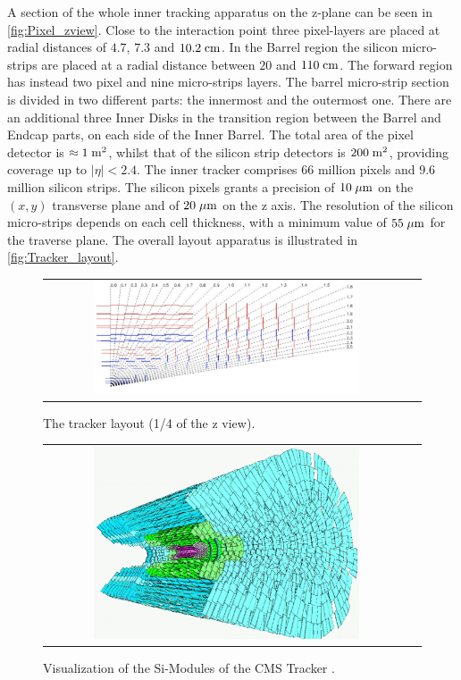A section of the whole inner tracking apparatus on the z-plane can be seen in \autoref{fig:Pixel_zview}. Close to the interaction point three pixel-layers are placed at radial distances of $4.7$, $7.3$ and $10.2\;\text{cm}$. In the Barrel region the silicon micro-strips are placed at a radial distance between $20$ and $110\;\text{cm}$. The forward region has instead two pixel and nine micro-strips layers. The barrel micro-strip section is divided in two different parts: the innermost and the outermost one. There are an additional three Inner Disks in the transition region between the Barrel and Endcap parts, on each side of the Inner Barrel. The total area of the pixel detector is $\approx 1\;\text{m}^{2}$, whilst that of the silicon strip detectors is $200\;\text{m}^{2}$, providing coverage up to $|\eta| < 2.4$. The inner tracker comprises 66 million pixels and $9.6$ million silicon strips. The silicon pixels grants a precision of $10\;\mu\text{m}$ on the $(x,y)$ transverse plane and of $20\;\mu\text{m}$ on the z axis. The resolution of the silicon micro-strips depends on each cell thickness, with a minimum value of $ 55\;\mu\text{m}$ for the traverse plane. The overall layout apparatus is illustrated in \autoref{fig:Tracker_layout}.


\begin{figure}[tbh!]
	\centering
	\begin{tabular}{cc}
		\includegraphics[width=0.75\textwidth]{detector/pics/Pixel_zview.pdf}
	\end{tabular}
	\caption{The tracker layout (1/4 of the z view).}
	\label{fig:Pixel_zview}
\end{figure}

\begin{figure}[tbh!]
	\centering
	\begin{tabular}{cc}
		\includegraphics[width=0.75\textwidth]{detector/pics/tracker2-2.pdf}
	\end{tabular}
	\caption{Visualization of the Si-Modules of the CMS Tracker \cite{Schael:2003ca}.}
	\label{fig:Tracker_layout}
\end{figure}

